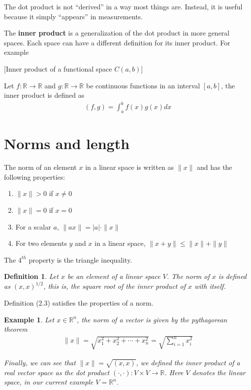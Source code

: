 \documentclass{book}
\newtheorem{example}{Example}[section]
\newtheorem{definition}{Definition}[section]
\begin{document}
The dot product is not ``derived'' in a way most things are. Instead, it is
useful because it simply ``appears'' in measurements.

The \textbf{inner product} is a generalization of the dot product in more
general spaces. Each space can have a different definition for its inner
product. For example

    [Inner product of a functional space $C(a,b)$]

Let $f:\mathbb{R} \to \mathbb{R}$ and $g:\mathbb{R} \to \mathbb{R}$ be
continuous functions in an interval $[a,b]$, the inner product is defined as
\begin{equation}
    \begin{split}
        \left(f,g\right) = \int_{a}^{b}{f(x)g(x)dx}
    \end{split}
\end{equation}

\section{Norms and length}

The norm of an element $x$ in a linear space is written as $\|x\|$ and has the
following properties:

\begin{enumerate}
    \item $\|x\| > 0$ if $x\neq 0$
    \item $\|x\| = 0$ if $x = 0$
    \item For a scalar $a$, $\|ax\| = |a|\cdot \|x\|$
    \item For two elements $y$ and $x$ in a linear space, $\|x+y\| \leq \|x\| + \|y\|$
\end{enumerate}

The $4^{th}$ property is the triangle inequality.

\begin{definition}
    Let $x$ be an element of a linear space $V$.
    The norm of $x$ is defined as $\left(x,x\right)^{1/2}$, this is,
    the square root of the inner product of $x$ with itself.
\end{definition}

Definition (2.3) satisfies the properties of a norm.

\begin{example}
    Let $x\in\mathbb{R}^{n}$, the norm of a vector is given by the pythagorean theorem
    \begin{equation*}
        \begin{split}
            \|x\| = \sqrt{x_1^{2} + x_2^{2} + \cdots + x_n^{2}}
            = \sqrt{\sum_{i=1}^{n}{x_i^{2}}}
        \end{split}
    \end{equation*}

    Finally, we can see that $\|x\|=\sqrt{\left(x,x\right)}$, we defined the inner
    product of a real vector space as the dot product $\left(\cdot, \cdot\right):
        V\times V \to \mathbb{R}$. Here $V$ denotes the linear space, in our current
    example $V=\mathbb{R}^{n}$.
\end{example}
\end{document}
